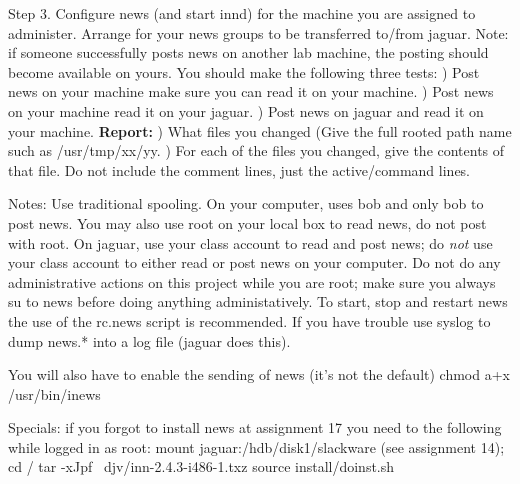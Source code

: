 Step 3. Configure news (and start {\ltt{}innd}) for the machine you are
assigned to administer.
Arrange for your news groups to be transferred to/from {\ltt{}jaguar}.
Note: if someone successfully posts news on another lab machine, the posting
should become available on yours.
You should make the following three tests:
\hfill{}) Post news on your machine make sure you can read it
on your machine.
\hfill{}) Post news on your machine read it on your {\ltt{}jaguar}.
\hfill{}) Post news on {\ltt{}jaguar} and read it on your machine.
\hfill\break
{\bf Report:}
\hfill{}) What files you changed (Give the full rooted path name such as
{\ltt{}/usr/tmp/xx/yy}.
\hfill{}) For each of the files you changed, give the contents of that file.
Do not include the comment lines, just the active/command lines.

Notes: Use traditional spooling. On your computer, uses {\ltt{}bob}
and only {\ltt{}bob} to post news. You may also use root on
your local box to read news, do not post with root.
On jaguar, use your class account to read and post news;
do {\it not} use your class account to either read or post news on your
computer. Do not do any administrative actions on this project
while you are root; make sure you always {\ltt{}su} to news before
doing anything administatively. To start, stop and restart news
the use of the {\ltt{}rc.news} script is recommended.
If you have trouble use syslog to dump {\ltt{}news.*} into a log file
({\ltt{}jaguar} does this).

You will also have to enable the sending of news (it's not the default)
\hfill\break
{\ltt{}chmod a+x /usr/bin/inews}

Specials: if you forgot to install news at assignment 17
you need to the following while logged in as root:
mount {\ltt{}jaguar:/hdb/disk1/slackware} (see assignment 14);
\hfill\break
{\ltt{}cd /}
\hfill\break
{\ltt{}tar -xJpf ~djv/inn-2.4.3-i486-1.txz}
\hfill\break
{\ltt{}source install/doinst.sh}

\bye
